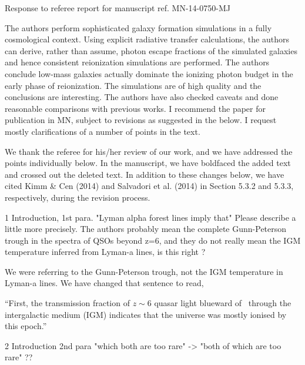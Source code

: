 \documentclass[11pt]{article}
\begin{document}
\begin{center} 
\bfseries{
\begin{large}
  Response to referee report for manuscript ref. MN-14-0750-MJ
\end{large}
}
\end{center}

\begin{referee}
The authors perform sophisticated galaxy formation simulations in a 
fully cosmological context. Using explicit radiative transfer
calculations, the authors can derive, rather than assume, photon
escape fractions of the simulated galaxies and hence consistent
reionization simulations are performed. The authors conclude
low-mass galaxies actually dominate the ionizing photon budget in
the early phase of reionization. The simulations are of high quality
and the conclusions are interesting. The authors have also checked
caveats and done reasonable comparisons with previous works. I
recommend the paper for publication in MN, subject to revisions as
suggested in the below. I request mostly clarifications of a number
of points in the text.
\end{referee}

We thank the referee for his/her review of our work, and we have
addressed the points individually below.  In the manuscript, we have
boldfaced the added text and crossed out the deleted text.  In
addition to these changes below, we have cited Kimm \& Cen (2014) and
Salvadori et al. (2014) in Section 5.3.2 and 5.3.3, respectively,
during the revision process.

\begin{referee}
1 Introduction, 1st para.
"Lyman alpha forest lines imply that"
Please describe a little more precisely.
The authors probably mean the complete Gunn-Peterson
trough in the spectra of QSOs beyond z=6, and they do
not really mean  the IGM temperature inferred from Lyman-a
lines, is this right ?
\end{referee}

We were referring to the Gunn-Peterson trough, not the IGM temperature
in Lyman-a lines.  We have changed that sentence to read,

``First, the transmission fraction of $z \sim 6$ quasar light blueward
of \lya~through the intergalactic medium (IGM) indicates that the
universe was mostly ionised by this epoch.''

\begin{referee}
2 Introduction 2nd para
"which both are too rare"
-> "both of which are too rare" ??
\end{referee}
\end{document}
